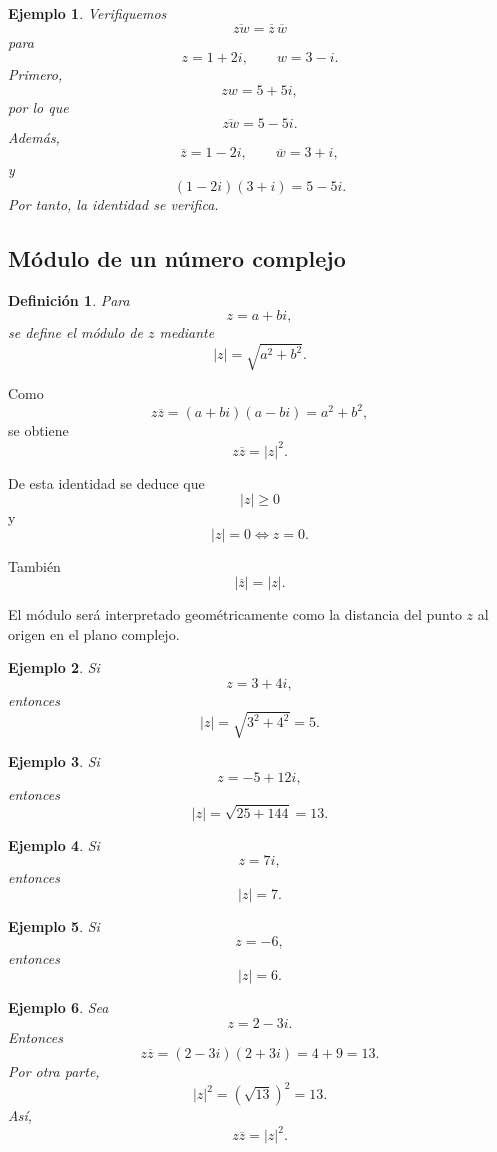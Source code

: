 \documentclass[12pt]{article}
\newtheorem{Ejem}{Ejemplo}
\newtheorem{Def}{Definici\'on}
\begin{document}
\begin{Ejem} Verifiquemos
\[
\overline{zw}=\overline z\,\overline w
\]
para
\[
z=1+2i,
\qquad
w=3-i.
\]
Primero,
\[
zw=5+5i,
\]
por lo que
\[
\overline{zw}=5-5i.
\]
Además,
\[
\overline z=1-2i,
\qquad
\overline w=3+i,
\]
y
\[
(1-2i)(3+i)=5-5i.
\]
Por tanto, la identidad se verifica.
\end{Ejem}


\subsection*{Módulo de un número complejo}

\begin{Def}
Para
\[
z=a+bi,
\]
se define el módulo de $z$ mediante
\[
\boxed{
|z|=\sqrt{a^2+b^2}.
}
\]
\end{Def}
Como
\[
z\overline z
=
(a+bi)(a-bi)
=
a^2+b^2,
\]
se obtiene
\[
\boxed{
z\overline z=|z|^2.
}
\]

De esta identidad se deduce que
\[
|z|\geq 0
\]
y
\[
\boxed{|z|=0\iff z=0.}
\]

También
\[
|\overline z|=|z|.
\]

El módulo será interpretado geométricamente como la distancia del punto
$z$ al origen en el plano complejo.

\begin{Ejem}
Si
\[
z=3+4i,
\]
entonces
\[
|z|=\sqrt{3^2+4^2}=5.
\]

\end{Ejem}

\begin{Ejem} Si
\[
z=-5+12i,
\]
entonces
\[
|z|=\sqrt{25+144}=13.
\]
\end{Ejem}

\begin{Ejem} Si
\[
z=7i,
\]
entonces
\[
|z|=7.
\]

\end{Ejem}

\begin{Ejem} Si
\[
z=-6,
\]
entonces
\[
|z|=6.
\]

\end{Ejem}

\begin{Ejem} Sea
\[
z=2-3i.
\]
Entonces
\[
z\overline z
=
(2-3i)(2+3i)
=
4+9
=
13.
\]
Por otra parte,
\[
|z|^2
=
(\sqrt{13})^2
=
13.
\]
Así,
\[
z\overline z=|z|^2.
\]
\end{Ejem}
\end{document}
